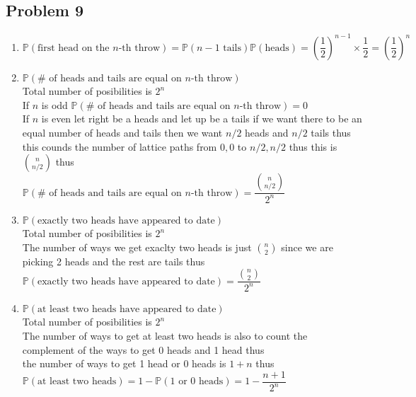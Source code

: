 \documentclass[12pt, letterpaper]{article}
\theoremstyle{definition}
\renewcommand{\P}{\mathbb{P}}
\renewcommand{\t}[1]{\text{#1}}
\begin{document}
\subsection*{Problem 9}
\begin{enumerate}
    \item $\P(\text{first head on  the $n$-th throw})=\P(n-1 \t{ tails})\P(\t{heads})=\left( \dfrac{1}{2} \right)^{n-1}\times \dfrac{1}{2}=\left( \dfrac{1}{2} \right)^n$
    \item $\P(\# \t{ of heads and tails are equal on $n$-th throw})$\\
    Total number of posibilities is $2^n$\\
    If $n$ is odd $\P(\# \t{ of heads and tails are equal on $n$-th throw})=0$\\
    If $n$ is even let right be a heads and let up be a tails if we want there to be an equal number of heads and tails then we want $n/2$ heads and $n/2$ tails thus this counds the number of lattice paths from $0,0$ to $n/2,n/2$
    thus this is $\binom{n}{n/2}$ thus\\
    $\P(\# \t{ of heads and tails are equal on $n$-th throw})=\dfrac{\binom{n}{n/2}}{2^n}$
    \item $\P(\t{exactly two heads have appeared to date})$\\
    Total number of posibilities is $2^n$\\
    The number of ways we get exaclty two heads is just $\binom{n}{2}$ since we are picking 2 heads and the rest are tails thus\\
    $\P(\t{exactly two heads have appeared to date})=\dfrac{\binom{n}{2}}{2^n}$
    \item $\P(\t{at least two heads have appeared to date})$\\
    Total number of posibilities is $2^n$\\
    The number of ways to get at least two heads is also to count the complement of the ways to get 0 heads and 1 head thus\\
    the number of ways to get 1 head or 0 heads is $1+n$ thus $\P(\t{at least two heads})=1-\P(\t{1 or 0 heads})=1-\dfrac{n+1}{2^n}$
\end{enumerate}
\end{document}
